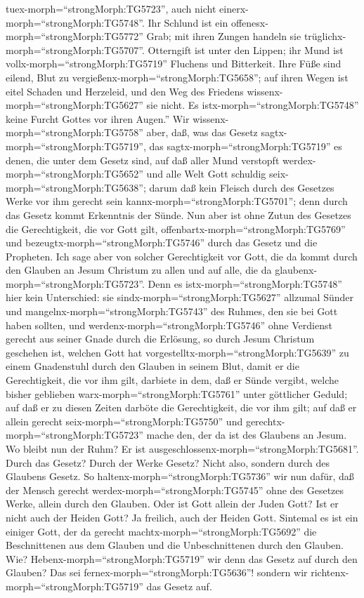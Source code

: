tuex-morph=``strongMorph:TG5723'', auch nicht
einerx-morph=``strongMorph:TG5748''.  Ihr Schlund ist ein
offenesx-morph=``strongMorph:TG5772'' Grab; mit ihren Zungen handeln sie
trüglichx-morph=``strongMorph:TG5707''. Otterngift ist unter den Lippen;
 ihr Mund ist vollx-morph=``strongMorph:TG5719'' Fluchens
und Bitterkeit.  Ihre Füße sind eilend, Blut zu
vergießenx-morph=``strongMorph:TG5658'';  auf ihren Wegen
ist eitel Schaden und Herzeleid,  und den Weg des Friedens
wissenx-morph=``strongMorph:TG5627'' sie nicht.  Es
istx-morph=``strongMorph:TG5748'' keine Furcht Gottes vor ihren Augen.''
 Wir wissenx-morph=``strongMorph:TG5758'' aber, daß, was
das Gesetz sagtx-morph=``strongMorph:TG5719'', das
sagtx-morph=``strongMorph:TG5719'' es denen, die unter dem Gesetz sind,
auf daß aller Mund verstopft werdex-morph=``strongMorph:TG5652'' und
alle Welt Gott schuldig seix-morph=``strongMorph:TG5638''; 
darum daß kein Fleisch durch des Gesetzes Werke vor ihm gerecht sein
kannx-morph=``strongMorph:TG5701''; denn durch das Gesetz kommt
Erkenntnis der Sünde.  Nun aber ist ohne Zutun des Gesetzes
die Gerechtigkeit, die vor Gott gilt,
offenbartx-morph=``strongMorph:TG5769'' und
bezeugtx-morph=``strongMorph:TG5746'' durch das Gesetz und die
Propheten.  Ich sage aber von solcher Gerechtigkeit vor
Gott, die da kommt durch den Glauben an Jesum Christum zu allen und auf
alle, die da glaubenx-morph=``strongMorph:TG5723''.  Denn
es istx-morph=``strongMorph:TG5748'' hier kein Unterschied: sie
sindx-morph=``strongMorph:TG5627'' allzumal Sünder und
mangelnx-morph=``strongMorph:TG5743'' des Ruhmes, den sie bei Gott haben
sollten,  und werdenx-morph=``strongMorph:TG5746'' ohne
Verdienst gerecht aus seiner Gnade durch die Erlösung, so durch Jesum
Christum geschehen ist,  welchen Gott hat
vorgestelltx-morph=``strongMorph:TG5639'' zu einem Gnadenstuhl durch den
Glauben in seinem Blut, damit er die Gerechtigkeit, die vor ihm gilt,
darbiete in dem, daß er Sünde vergibt, welche bisher geblieben
warx-morph=``strongMorph:TG5761'' unter göttlicher Geduld; 
auf daß er zu diesen Zeiten darböte die Gerechtigkeit, die vor ihm gilt;
auf daß er allein gerecht seix-morph=``strongMorph:TG5750'' und
gerechtx-morph=``strongMorph:TG5723'' mache den, der da ist des Glaubens
an Jesum.  Wo bleibt nun der Ruhm? Er ist
ausgeschlossenx-morph=``strongMorph:TG5681''. Durch das Gesetz? Durch
der Werke Gesetz? Nicht also, sondern durch des Glaubens Gesetz.
 So haltenx-morph=``strongMorph:TG5736'' wir nun dafür, daß
der Mensch gerecht werdex-morph=``strongMorph:TG5745'' ohne des Gesetzes
Werke, allein durch den Glauben.  Oder ist Gott allein der
Juden Gott? Ist er nicht auch der Heiden Gott? Ja freilich, auch der
Heiden Gott.  Sintemal es ist ein einiger Gott, der da
gerecht machtx-morph=``strongMorph:TG5692'' die Beschnittenen aus dem
Glauben und die Unbeschnittenen durch den Glauben.  Wie?
Hebenx-morph=``strongMorph:TG5719'' wir denn das Gesetz auf durch den
Glauben? Das sei fernex-morph=``strongMorph:TG5636''! sondern wir
richtenx-morph=``strongMorph:TG5719'' das Gesetz auf.

